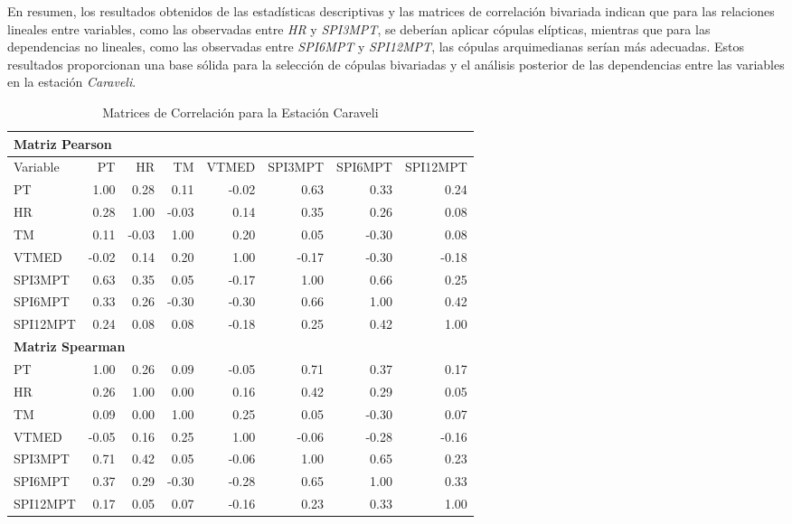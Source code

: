 En resumen, los resultados obtenidos de las estadísticas descriptivas y las matrices de correlación bivariada indican que para las relaciones lineales entre variables, como las observadas entre \textit{HR} y \textit{SPI3MPT}, se deberían aplicar cópulas elípticas, mientras que para las dependencias no lineales, como las observadas entre \textit{SPI6MPT} y \textit{SPI12MPT}, las cópulas arquimedianas serían más adecuadas. Estos resultados proporcionan una base sólida para la selección de cópulas bivariadas y el análisis posterior de las dependencias entre las variables en la estación \textit{Caraveli}.




\begin{table}[ht]
\centering
\caption{Matrices de Correlación para la Estación Caraveli}
\begin{tabular}{lrrrrrrr}
\toprule
\multicolumn{8}{l}{\textbf{Matriz Pearson}} \\
\midrule
Variable & PT & HR & TM & VTMED & SPI3MPT & SPI6MPT & SPI12MPT \\
\midrule
PT       & 1.00 & 0.28 & 0.11 & -0.02 & 0.63 & 0.33 & 0.24 \\
HR       & 0.28 & 1.00 & -0.03 & 0.14 & 0.35 & 0.26 & 0.08 \\
TM       & 0.11 & -0.03 & 1.00 & 0.20 & 0.05 & -0.30 & 0.08 \\
VTMED    & -0.02 & 0.14 & 0.20 & 1.00 & -0.17 & -0.30 & -0.18 \\
SPI3MPT  & 0.63 & 0.35 & 0.05 & -0.17 & 1.00 & 0.66 & 0.25 \\
SPI6MPT  & 0.33 & 0.26 & -0.30 & -0.30 & 0.66 & 1.00 & 0.42 \\
SPI12MPT & 0.24 & 0.08 & 0.08 & -0.18 & 0.25 & 0.42 & 1.00 \\
\midrule
\multicolumn{8}{l}{\textbf{Matriz Spearman}} \\
\midrule
PT       & 1.00 & 0.26 & 0.09 & -0.05 & 0.71 & 0.37 & 0.17 \\
HR       & 0.26 & 1.00 & 0.00 & 0.16 & 0.42 & 0.29 & 0.05 \\
TM       & 0.09 & 0.00 & 1.00 & 0.25 & 0.05 & -0.30 & 0.07 \\
VTMED    & -0.05 & 0.16 & 0.25 & 1.00 & -0.06 & -0.28 & -0.16 \\
SPI3MPT  & 0.71 & 0.42 & 0.05 & -0.06 & 1.00 & 0.65 & 0.23 \\
SPI6MPT  & 0.37 & 0.29 & -0.30 & -0.28 & 0.65 & 1.00 & 0.33 \\
SPI12MPT & 0.17 & 0.05 & 0.07 & -0.16 & 0.23 & 0.33 & 1.00 \\

\end{tabular}
\end{table}
